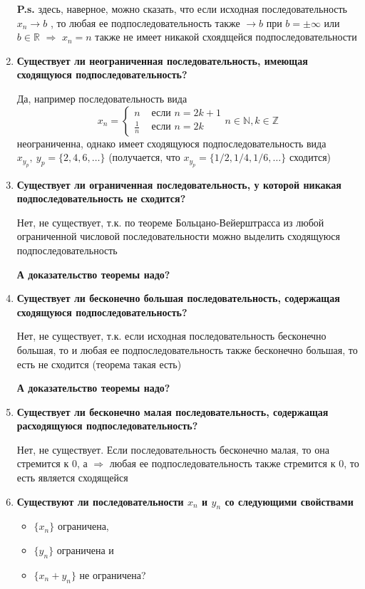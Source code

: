 \documentclass[a4paper,12pt]{article}
\begin{document}
\begin{enumerate}
{      \textbf{P.s.} здесь, наверное, можно сказать, что если исходная последовательность $x_n \rightarrow b$
      , то любая ее подпоследовательность также $\rightarrow b$ при $b = \pm\infty$ или $b \in \mathbb{R}$ $\Rightarrow$
      $x_n = n$ также не имеет никакой схоядщейся подпоследовательности
    }
    \item {
      \textbf{Существует ли неограниченная последовательность, имеющая сходящуюся подпоследовательность?}

      Да, например последовательность вида
      \begin{equation}
        x_n = \begin{cases}
          n &\text{ если } n = 2k + 1 \\
          \frac{1}{n} &\text{ если } n = 2k
        \end{cases} n \in \mathbb{N}, k \in \mathbb{Z}
      \end{equation}
      неограниченна, однако имеет сходящуюся подпоследовательность вида $x_{y_p},\: y_p = \{2, 4, 6, \dots\}$
      (получается, что $x_{y_p} = \{1/2, 1/4, 1/6, \dots\}$ сходится)
    }
    \item {
      \textbf{Существует ли ограниченная последовательность, у которой никакая подпоследовательность не сходится?}
    
      Нет, не существует, т.к. по теореме Больцано-Вейерштрасса из любой ограниченной числовой последовательности
      можно выделить сходящуюся подпоследовательность

      \textbf{А доказательство теоремы надо?}
    }
    \item {
      \textbf{Существует ли бесконечно большая последовательность, содержащая сходящуюся подпоследовательность?}

      Нет, не существует, т.к. если исходная последовательность бесконечно большая,
      то и любая ее подпоследовательность также бесконечно большая, то есть не сходится (теорема такая есть)

      \textbf{А доказательство теоремы надо?}
    }
    \item {
      \textbf{Существует ли бесконечно малая последовательность, содержащая расходящуюся подпоследовательность?}

      Нет, не существует. Если последовательность бесконечно малая, то она стремится к 0, а $\Rightarrow$
      любая ее подпоследовательность также стремится к 0, то есть является сходящейся  
    }
    \item {
      \textbf{Существуют ли последовательности $x_n$ и $y_n$ со следующими свойствами}
      \begin{itemize}
        \item $\{x_n\}$ ограничена,
        \item $\{y_n\}$ ограничена и
        \item $\{x_n + y_n\}$ не ограничена?
      \end{itemize}

}
\end{enumerate}
\end{document}
